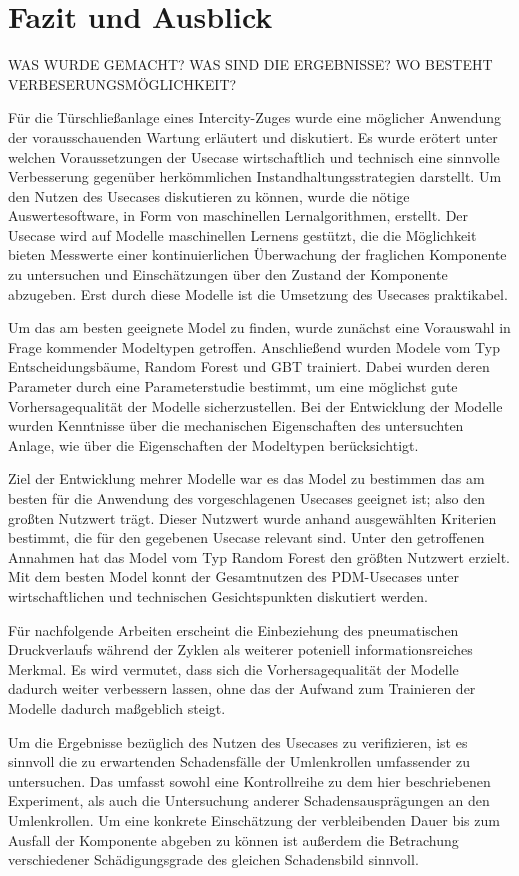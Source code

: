 \chapter{Fazit und Ausblick}
\label{ch:fazit}
WAS WURDE GEMACHT? WAS SIND DIE ERGEBNISSE? WO BESTEHT VERBESERUNGSMÖGLICHKEIT? 

Für die Türschließanlage eines Intercity-Zuges wurde eine möglicher Anwendung der vorausschauenden Wartung erläutert und diskutiert. Es wurde erötert unter welchen Voraussetzungen der Usecase wirtschaftlich und technisch eine sinnvolle Verbesserung gegenüber herkömmlichen Instandhaltungsstrategien darstellt. Um den Nutzen des Usecases diskutieren zu können, wurde die nötige Auswertesoftware, in Form von maschinellen Lernalgorithmen, erstellt. Der Usecase wird auf Modelle maschinellen Lernens gestützt, die die Möglichkeit bieten Messwerte einer kontinuierlichen Überwachung der fraglichen Komponente zu untersuchen und Einschätzungen über den Zustand der Komponente abzugeben. Erst durch diese Modelle ist die Umsetzung des Usecases praktikabel. 

Um das am besten geeignete Model zu finden, wurde zunächst eine Vorauswahl in Frage kommender Modeltypen getroffen. Anschließend wurden Modele vom Typ Entscheidungsbäume, Random Forest und GBT trainiert. Dabei wurden deren Parameter durch eine Parameterstudie bestimmt, um eine möglichst gute Vorhersagequalität der Modelle sicherzustellen. Bei der Entwicklung der Modelle wurden Kenntnisse über die mechanischen Eigenschaften des untersuchten Anlage, wie über die Eigenschaften der Modeltypen berücksichtigt.

Ziel der Entwicklung mehrer Modelle war es das Model zu bestimmen das am besten für die Anwendung des vorgeschlagenen Usecases geeignet ist; also den großten Nutzwert trägt. Dieser Nutzwert wurde anhand ausgewählten Kriterien bestimmt, die für den gegebenen Usecase relevant sind. Unter den getroffenen Annahmen hat das Model vom Typ Random Forest den größten Nutzwert erzielt. Mit dem besten Model konnt der Gesamtnutzen des PDM-Usecases unter wirtschaftlichen und technischen Gesichtspunkten diskutiert werden.

Für nachfolgende Arbeiten erscheint die Einbeziehung des pneumatischen Druckverlaufs während der Zyklen als weiterer poteniell informationsreiches Merkmal. Es wird vermutet, dass sich die Vorhersagequalität der Modelle dadurch weiter verbessern lassen, ohne das der Aufwand zum Trainieren der Modelle dadurch maßgeblich steigt. 

Um die Ergebnisse bezüglich des Nutzen des Usecases zu verifizieren, ist es sinnvoll die zu erwartenden Schadensfälle der Umlenkrollen umfassender zu untersuchen. Das umfasst sowohl eine Kontrollreihe zu dem hier beschriebenen Experiment, als auch die Untersuchung anderer Schadensausprägungen an den Umlenkrollen. Um eine konkrete Einschätzung der verbleibenden Dauer bis zum Ausfall der Komponente abgeben zu können ist außerdem die Betrachung verschiedener Schädigungsgrade des gleichen Schadensbild sinnvoll. 